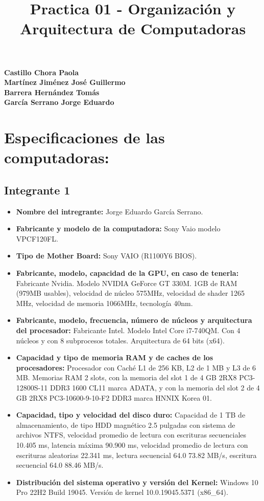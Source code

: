 \documentclass[12pt]{article}
\newcommand{\pl}[1]{\item \textbf{ #1 }}
\begin{document}

%

\title{Practica 01 - Organización y Arquitectura de Computadoras}
\begin{center}
    \textbf{Castillo Chora Paola}\\
    \textbf{Martínez Jiménez José Guillermo}\\
    \textbf{Barrera Hernández Tomás}\\
    \textbf{García Serrano Jorge Eduardo}\\
    
\end{center}

\section{Especificaciones de las computadoras:}
\subsection{Integrante 1}
\begin{itemize}
    \pl{Nombre del intregrante:} Jorge Eduardo García Serrano.

    \pl{Fabricante y modelo de la computadora:} Sony Vaio modelo VPCF120FL.

    \pl{Tipo de Mother Board:} Sony VAIO (R1100Y6 BIOS).

    \pl{Fabricante, modelo, capacidad de la GPU, en caso de tenerla:} Fabricante Nvidia. Modelo NVIDIA GeForce GT 330M. 1GB de RAM (979MB usables), velocidad de núcleo 575MHz, velocidad de shader 1265 MHz, velocidad de memoria 1066MHz, tecnología 40nm.

    \pl{Fabricante, modelo, frecuencia, número de núcleos y arquitectura del procesador:} Fabricante Intel. Modelo Intel Core i7-740QM. Con 4 núcleos y con 8 subprocesos totales. Arquitectura de 64 bits (x64).

    \pl{Capacidad y tipo de memoria RAM y de caches de los procesadores:} Procesador con Caché L1 de 256 KB, L2 de 1 MB y L3 de 6 MB. Memorias RAM 2 slots, con la memoria del slot 1 de 4 GB 2RX8 PC3-12800S-11 DDR3 1600 CL11 marca ADATA, y con la memoria del slot 2 de 4 GB 2RX8 PC3-10600-9-10-F2 DDR3 marca HNNIX Korea 01.

    \pl{Capacidad, tipo y velocidad del disco duro:} Capacidad de 1 TB de almacenamiento, de tipo HDD magnético 2.5 pulgadas con sistema de archivos NTFS, velocidad promedio de lectura con escrituras secuenciales  10.405 ms, latencia máxima 90.900 ms, velocidad promedio de lectura con escrituras aleatorias 22.341 ms, lectura secuencial 64.0 73.82 MB/s, escritura secuencial 64.0 88.46 MB/s.

    \pl{Distribución del sistema operativo y versión del Kernel:} Windows 10 Pro 22H2 Build 19045. Versión de kernel 10.0.19045.5371 (x86\_64).
\end{itemize}
\end{document}

